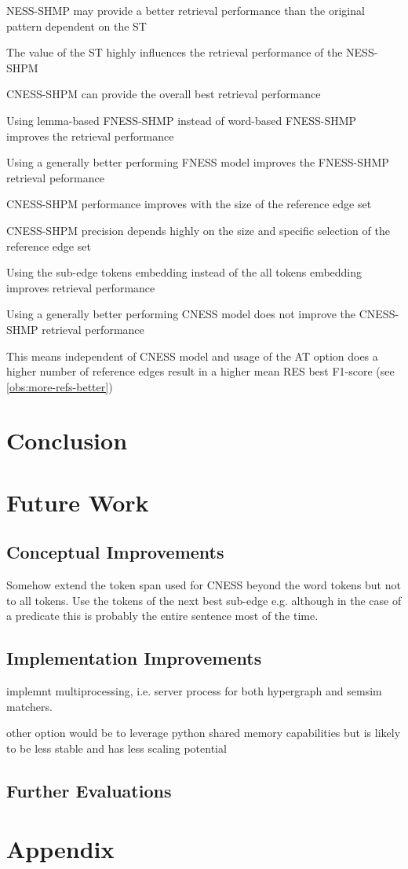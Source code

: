 \documentclass[11pt]{scrreprt}
\begin{document}
NESS-SHMP may provide a better retrieval performance than the original pattern dependent on the ST

The value of the ST highly influences the retrieval performance of the NESS-SHPM

CNESS-SHPM can provide the overall best retrieval performance


Using lemma-based FNESS-SHMP instead of word-based FNESS-SHMP improves the retrieval performance 

Using a generally better performing FNESS model improves the FNESS-SHMP retrieval peformance

CNESS-SHPM performance improves with the size of the reference edge set

CNESS-SHPM precision depends highly on the size and specific selection of the reference edge set

Using the sub-edge tokens embedding instead of the all tokens embedding improves retrieval performance

Using a generally better performing CNESS model does not improve the CNESS-SHMP retrieval performance








This means independent of CNESS model and usage of the AT option does a higher number of reference edges result in a higher mean RES best F1-score (see \cref{obs:more-refs-better})







\chapter{Conclusion}

\chapter{Future Work}
\section{Conceptual Improvements}
Somehow extend the token span used for CNESS beyond the word tokens but not to all tokens. Use the tokens of the next best sub-edge e.g. although in the case of a predicate this is probably the entire sentence most of the time.

\section{Implementation Improvements}
implemnt multiprocessing, i.e. server process for both hypergraph and semsim matchers. 

other option would be to leverage python shared memory capabilities but is likely to be less stable and has less scaling potential

\section{Further Evaluations}


\printbibliography
\appendix
\chapter{Appendix}

\end{document}
